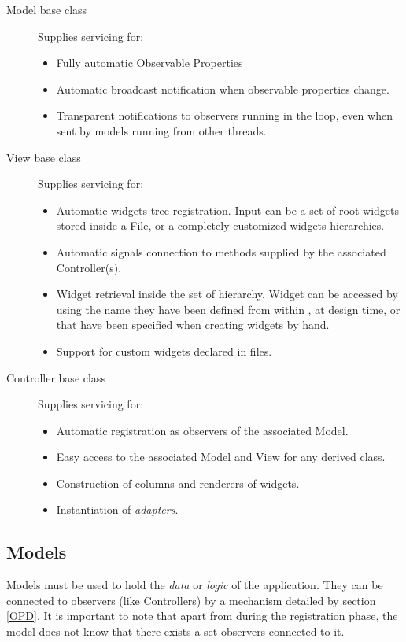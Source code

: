 \begin{description}

\item[Model base class] Supplies servicing for:
 \begin{itemize} 
 \item Fully automatic Observable Properties 
 \item Automatic broadcast notification when observable properties
 change.
 \item Transparent notifications to observers running in the \pygtk
   loop, even when sent by models running from other threads.
 \end{itemize}

\item[View base class] Supplies servicing for:
 \begin{itemize} 
 \item Automatic widgets tree registration. Input can be a set of root
 widgets stored inside a \glade File, or a completely customized widgets
 hierarchies.
 \item Automatic signals connection to methods supplied by the
 associated Controller(s).
\item Widget retrieval inside the set of hierarchy. Widget can be
  accessed by using the name they have been defined from within
  \glade, at design time, or that have been specified when creating
  widgets by hand.
\item Support for custom widgets declared in \glade files.
 \end{itemize}

 \item[Controller base class] Supplies servicing for:
 \begin{itemize} 
 \item Automatic registration as observers of the associated Model.
 \item Easy access to the associated Model and View for any derived
   class.
 \item Construction of columns and renderers of
    widgets.
 \item Instantiation of \emph{adapters}.
 \end{itemize}

\end{description}


\subsection{\label{MODELS} Models}
Models must be used to hold the \emph{data} or \emph{logic} of the
application. They can be connected to observers (like Controllers) by
a mechanism detailed by section \ref{OPD}.  It is important to note
that apart from during the registration phase, the model does not know
that there exists a set observers connected to it.

